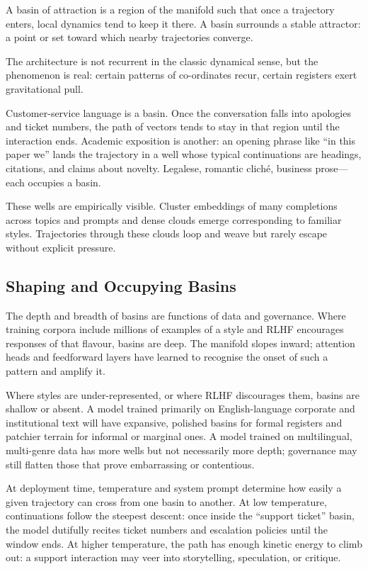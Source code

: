 \documentclass[12pt,a4paper]{article}
\begin{document}
A basin of attraction is a region of the manifold such that once a trajectory enters, local dynamics tend to keep it there. A basin surrounds a stable attractor: a point or set toward which nearby trajectories converge.

The architecture is not recurrent in the classic dynamical sense, but the phenomenon is real: certain patterns of co-ordinates recur, certain registers exert gravitational pull.

Customer-service language is a basin. Once the conversation falls into apologies and ticket numbers, the path of vectors tends to stay in that region until the interaction ends. Academic exposition is another: an opening phrase like ``in this paper we'' lands the trajectory in a well whose typical continuations are headings, citations, and claims about novelty. Legalese, romantic cliché, business prose---each occupies a basin.

These wells are empirically visible. Cluster embeddings of many completions across topics and prompts and dense clouds emerge corresponding to familiar styles. Trajectories through these clouds loop and weave but rarely escape without explicit pressure.

\subsection{Shaping and Occupying Basins}

The depth and breadth of basins are functions of data and governance. Where training corpora include millions of examples of a style and RLHF encourages responses of that flavour, basins are deep. The manifold slopes inward; attention heads and feedforward layers have learned to recognise the onset of such a pattern and amplify it.

Where styles are under-represented, or where RLHF discourages them, basins are shallow or absent. A model trained primarily on English-language corporate and institutional text will have expansive, polished basins for formal registers and patchier terrain for informal or marginal ones. A model trained on multilingual, multi-genre data has more wells but not necessarily more depth; governance may still flatten those that prove embarrassing or contentious.

At deployment time, temperature and system prompt determine how easily a given trajectory can cross from one basin to another. At low temperature, continuations follow the steepest descent: once inside the ``support ticket'' basin, the model dutifully recites ticket numbers and escalation policies until the window ends. At higher temperature, the path has enough kinetic energy to climb out: a support interaction may veer into storytelling, speculation, or critique.
\end{document}
